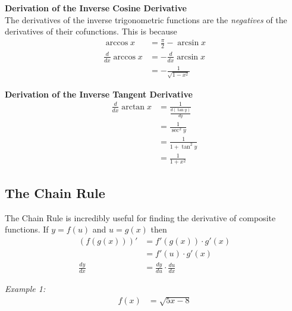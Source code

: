         \noindent \color{purple} \textbf{Derivation of the Inverse Cosine Derivative} \color{black} \\
        The derivatives of the inverse trigonometric functions are the \textit{negatives} of the
        derivatives of their cofunctions. This is because \\

        \begin{align*}
            \arccos{x} &= \frac{\pi}{2} - \arcsin{x} \\
            \frac{d}{dx}\arccos{x} &= -\frac{d}{dx}\arcsin{x} \\
            &= -\frac{1}{\sqrt{1-x^2}}
        \end{align*}

        \noindent \color{purple} \textbf{Derivation of the Inverse Tangent Derivative} \color{black} \\

        \begin{align*}
            \frac{d}{dx}\arctan{x} &= \frac{1}{\frac{d(\tan{y})}{dy}} \\
            &= \frac{1}{\sec^2{y}} \\
            &= \frac{1}{1+\tan^2{y}} \\
            &= \frac{1}{1+x^2}
        \end{align*}

    \pagebreak
    \subsection{The Chain Rule}
        The Chain Rule is incredibly useful for finding the derivative of composite functions.
        If $y=f(u)$ and $u=g(x)$ then \\

        \begin{align*}
            (f(g(x)))' &= f'(g(x)) \cdot g'(x) \\
            &= f'(u) \cdot g'(x) \\
            \frac{dy}{dx} &= \frac{dy}{du} \cdot \frac{du}{dx}
        \end{align*}

        \noindent \color{blue} \textit{Example 1:} \color{black} \\

        \begin{align*}
            f(x) &= \sqrt{5x-8} \\
        \end{align*}


